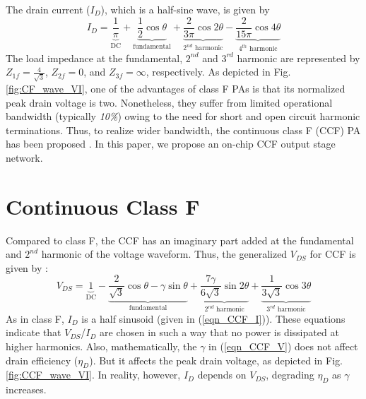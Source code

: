 \documentclass[conference]{IEEEtran}
\begin{document}
The drain current ($I_{D}$), which is a half-sine wave, is given by
\begin{equation}
I_{D}=\underbrace{\frac{1}{\pi}}_{\text{DC}}+\underbrace{\frac{1}{2} \cos \theta}_{\text{fundamental}}+\underbrace{\frac{2}{3 \pi} \cos 2 \theta}_{\text{$2^{nd}$ harmonic}}-\underbrace{\frac{2}{15 \pi} \cos 4 \theta}_{\text{$4^{th}$ harmonic}}
\label{eqn_CCF_I}
\end{equation}
The load impedance at the fundamental, $2^{nd}$ and $3^{rd}$ harmonic are represented by $Z_{1f}=\frac{4}{\sqrt{3}}$, $Z_{2f}=0$, and $Z_{3f}=\infty$, respectively. As depicted in Fig. \ref{fig:CF_wave_VI},  one of the advantages of class F PAs is that its normalized peak drain voltage is two. Nonetheless, they suffer from limited operational bandwidth (typically \textit{10\%}) owing to the need for short and open circuit harmonic terminations. Thus, to realize wider bandwidth, the continuous class F (CCF) PA has been proposed \cite{CCF_reason}. In this paper, we propose an on-chip CCF output stage network. 


\section{Continuous Class F}
\label{section:CCF}
\vspace{-0.05in}
Compared to class F, the CCF has an imaginary part added at the fundamental and $2^{nd}$ harmonic of the voltage waveform. Thus, the generalized $V_{DS}$ for CCF is given by \cite{ECCF_Carrubba}:
\begin{equation}
V_{DS}=\underbrace{1}_{\text{DC}}-\underbrace{\frac{2}{\sqrt{3}} \cos \theta-\gamma \sin \theta}_{\text{fundamental}}+\underbrace{\frac{7 \gamma}{6 \sqrt{3}} \sin 2 \theta}_{\text{$2^{nd}$ harmonic}}+\underbrace{\frac{1}{3 \sqrt{3}} \cos 3 \theta}_{\text{$3^{rd}$ harmonic}}
\label{eqn_CCF_V}
\end{equation}
As in class F, $I_{D}$ is a half sinusoid (given in (\ref{eqn_CCF_I})). These equations indicate that $V_{DS}$/$I_{D}$ are chosen in such a way that no power is dissipated at higher harmonics. Also, mathematically, the $\gamma$ in (\ref{eqn_CCF_V}) does not affect drain efficiency ($\eta_D$). But it affects the peak drain voltage, as depicted in Fig. \ref{fig:CCF_wave_VI}. In reality, however, $I_{D}$ depends on $V_{DS}$, degrading $\eta_D$ as $\gamma$ increases.
\end{document}
